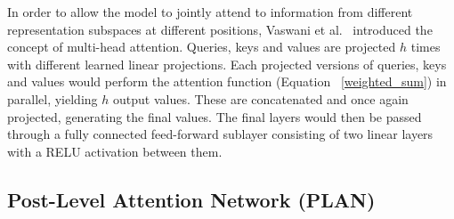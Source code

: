 \documentclass[letterpaper]{article} %
\begin{document}
In order to allow the model to jointly attend to information from different representation subspaces at different positions, Vaswani et al.~ introduced the concept of multi-head attention. Queries, keys and values are projected $h$ times with different learned linear projections. Each projected versions of queries, keys and values would perform the attention function (Equation ~\ref{weighted_sum}) in parallel, yielding $h$ output values. These are concatenated and once again projected, generating the final values. The final layers would then be passed through a fully connected feed-forward sublayer consisting of two linear layers with a RELU activation between them. 

\subsection{Post-Level Attention Network (PLAN)} 
\label{sec:plan}
\end{document}
